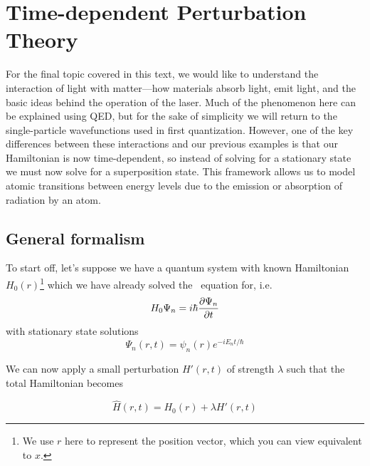 %

%

\chapter[Perturbation Theory]{Time-dependent Perturbation Theory} \label{ch:pert}
For the final topic covered in this text, we would like to understand the interaction of light with matter---how materials absorb light, emit light, and the basic ideas behind the operation of the laser. Much of the phenomenon here can be explained using QED, but for the sake of simplicity we will return to the single-particle wavefunctions used in first quantization. However, one of the key differences between these interactions and our previous examples is that our Hamiltonian is now time-dependent, so instead of solving for a stationary state we must now solve for a superposition state. This framework allows us to model atomic transitions between energy levels due to the emission or absorption of radiation by an atom.

\section{General formalism}
To start off, let's suppose we have a quantum system with known Hamiltonian $H_0(r)$\footnote{We use $r$ here to represent the position vector, which you can view equivalent to $x$.} which we have already solved the \Sch\ equation for, i.e.
\begin{equation*}
	H_0\Psi_n = i\hbar \pdv{\Psi_n}{t}
\end{equation*}
with stationary state solutions
\begin{equation*}
	\Psi_n(r,t) = \psi_n(r)e^{-iE_nt/\hbar}
\end{equation*}

We can now apply a small perturbation $H'(r,t)$ of strength $\lambda$ such that the total Hamiltonian becomes 
\begin{tcolorbox}[title = Hamiltonian for small perturbations] \vspace{-2ex}
	\begin{equation}
	\hat{H}(r,t) = H_0(r) + \lambda H'(r,t) \label{eq:ham-pert}
	\end{equation}	
\end{tcolorbox}
	
